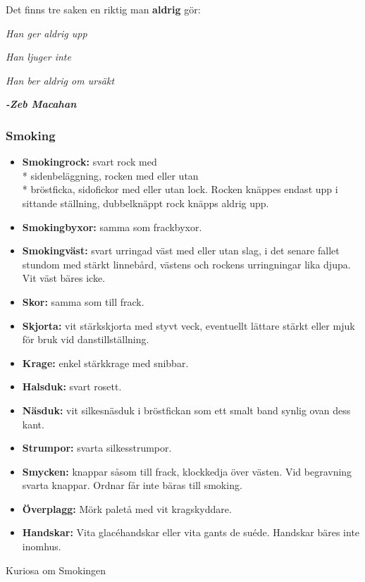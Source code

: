 \newpage

Det finns tre saken en riktig man \textbf{aldrig} gör:

\textit{Han ger aldrig upp}

\textit{Han ljuger inte}

\textit{Han ber aldrig om ursäkt}

\textit{\textbf{-Zeb Macahan}}

\subsubsection*{\textbf{Smoking}}

\begin{itemize}

    \item[]\textbf{Smokingrock:} svart rock med\\* sidenbeläggning, rocken med eller utan\\* bröstficka, sidofickor med eller utan lock. Rocken knäppes endast upp i sittande ställning, dubbelknäppt rock knäpps aldrig upp.

    \item[]\textbf{Smokingbyxor:} samma som frackbyxor.

    \item[]\textbf{Smokingväst:} svart urringad väst med eller utan slag, i det senare fallet stundom med stärkt linnebård, västens och rockens urringningar lika djupa. Vit väst bäres icke.

    \item[]\textbf{Skor:} samma som till frack.

    \item[]\textbf{Skjorta:} vit stärkskjorta med styvt veck, eventuellt lättare stärkt eller mjuk för bruk vid danstillställning.

    \item[]\textbf{Krage:} enkel stärkkrage med snibbar.

    \item[]\textbf{Halsduk:} svart rosett.

    \item[]\textbf{Näsduk:} vit silkesnäsduk i bröstfickan som ett smalt band synlig ovan dess kant.

    \item[]\textbf{Strumpor:} svarta silkesstrumpor.

    \item[]\textbf{Smycken:} knappar såsom till frack, klockkedja över västen. Vid begravning svarta knappar. Ordnar får inte bäras till smoking.

    \item[]\textbf{Överplagg:} Mörk paletå med vit kragskyddare.

    \item[]\textbf{Handskar:} Vita glacéhandskar eller vita gants de suéde. Handskar bäres inte inomhus.

\end{itemize}
Kuriosa om Smokingen

